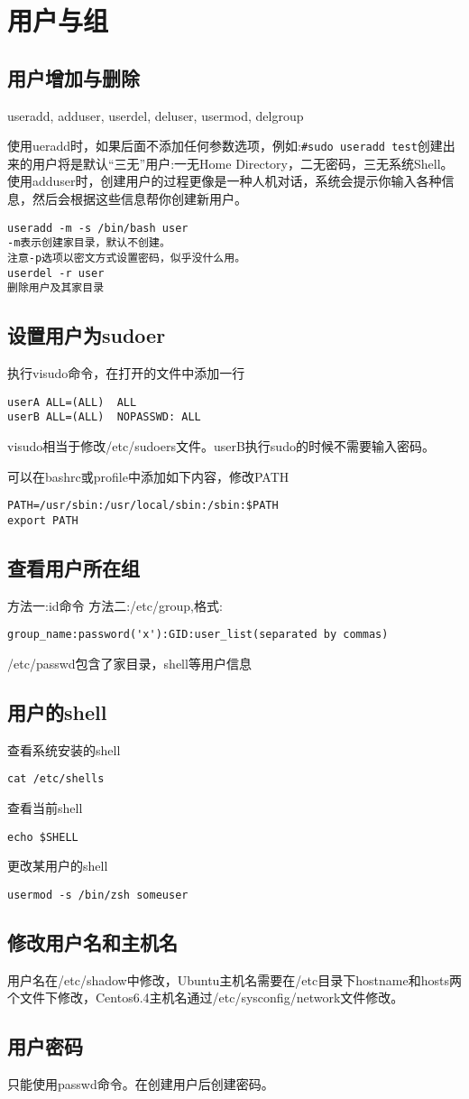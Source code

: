 \section{用户与组}

\subsection{用户增加与删除}
useradd, adduser, userdel, deluser, usermod, delgroup

使用ueradd时，如果后面不添加任何参数选项，例如:\verb+#sudo useradd test+创建出来的用户将是默认“三无”用户:一无Home Directory，二无密码，三无系统Shell。
使用adduser时，创建用户的过程更像是一种人机对话，系统会提示你输入各种信息，然后会根据这些信息帮你创建新用户。
\begin{verbatim}
useradd -m -s /bin/bash user 
-m表示创建家目录，默认不创建。
注意-p选项以密文方式设置密码，似乎没什么用。
userdel -r user
删除用户及其家目录
\end{verbatim}

\subsection{设置用户为sudoer}
执行visudo命令，在打开的文件中添加一行
\begin{verbatim}
userA ALL=(ALL)  ALL
userB ALL=(ALL)  NOPASSWD: ALL
\end{verbatim}
visudo相当于修改/etc/sudoers文件。userB执行sudo的时候不需要输入密码。

可以在bashrc或profile中添加如下内容，修改PATH
\begin{verbatim}
PATH=/usr/sbin:/usr/local/sbin:/sbin:$PATH
export PATH
\end{verbatim}

\subsection{查看用户所在组}
方法一:id命令
方法二:/etc/group,格式:
\begin{verbatim}
group_name:password('x'):GID:user_list(separated by commas)
\end{verbatim}

/etc/passwd包含了家目录，shell等用户信息

\subsection{用户的shell}
查看系统安装的shell
\begin{verbatim}
cat /etc/shells
\end{verbatim}

查看当前shell
\begin{verbatim}
echo $SHELL
\end{verbatim}

更改某用户的shell
\begin{verbatim}
usermod -s /bin/zsh someuser
\end{verbatim}


\subsection{修改用户名和主机名}
用户名在/etc/shadow中修改，Ubuntu主机名需要在/etc目录下hostname和hosts两个文件下修改，Centos6.4主机名通过/etc/sysconfig/network文件修改。

\subsection{用户密码}
只能使用passwd命令。在创建用户后创建密码。
